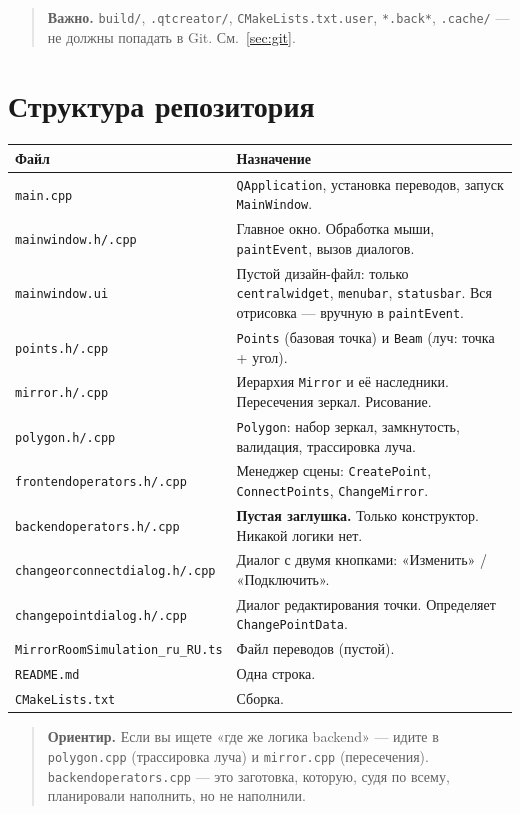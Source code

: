 \documentclass[a4paper,11pt]{article}
\newcommand{\file}[1]{\texttt{#1}}
\newcommand{\code}[1]{\texttt{#1}}
\begin{document}
\begin{quote}
\textbf{Важно.} \file{build/}, \file{.qtcreator/}, \file{CMakeLists.txt.user},
\file{*.back*}, \file{.cache/} — не должны попадать в Git.
См.~\ref{sec:git}.
\end{quote}

\section{Структура репозитория}

\begin{longtable}{@{}p{5.8cm}p{8.7cm}@{}}
\toprule
\textbf{Файл} & \textbf{Назначение} \\ \midrule
\endhead
\file{main.cpp} & \code{QApplication}, установка переводов, запуск \code{MainWindow}. \\
\file{mainwindow.h/.cpp} & Главное окно. Обработка мыши, \code{paintEvent}, вызов диалогов. \\
\file{mainwindow.ui} & Пустой дизайн-файл: только \code{centralwidget}, \code{menubar}, \code{statusbar}. Вся отрисовка — вручную в \code{paintEvent}. \\
\file{points.h/.cpp} & \code{Points} (базовая точка) и \code{Beam} (луч: точка + угол). \\
\file{mirror.h/.cpp} & Иерархия \code{Mirror} и её наследники. Пересечения зеркал. Рисование. \\
\file{polygon.h/.cpp} & \code{Polygon}: набор зеркал, замкнутость, валидация, трассировка луча. \\
\file{frontendoperators.h/.cpp} & Менеджер сцены: \code{CreatePoint}, \code{ConnectPoints}, \code{ChangeMirror}. \\
\file{backendoperators.h/.cpp} & \textbf{Пустая заглушка.} Только конструктор. Никакой логики нет. \\
\file{changeorconnectdialog.h/.cpp} & Диалог с двумя кнопками: «Изменить» / «Подключить». \\
\file{changepointdialog.h/.cpp} & Диалог редактирования точки. Определяет \code{ChangePointData}. \\
\file{MirrorRoomSimulation\_ru\_RU.ts} & Файл переводов (пустой). \\
\file{README.md} & Одна строка. \\
\file{CMakeLists.txt} & Сборка. \\
\bottomrule
\end{longtable}

\begin{quote}
\textbf{Ориентир.} Если вы ищете «где же логика backend» — идите в
\file{polygon.cpp} (трассировка луча) и \file{mirror.cpp} (пересечения).
\file{backendoperators.cpp} — это заготовка, которую, судя по всему,
планировали наполнить, но не наполнили.
\end{quote}
\end{document}
